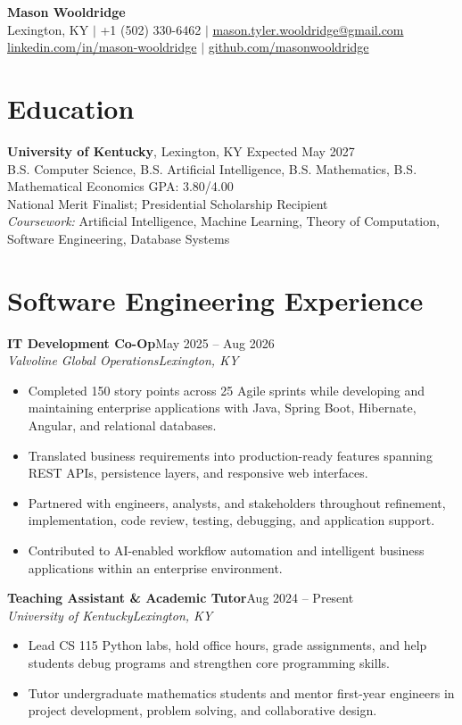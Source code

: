 \documentclass[10pt,letterpaper]{article}
\newcommand{\entry}[4]{%
  \textbf{#1}\hfill #2\\
  \textit{#3}\hfill \textit{#4}\vspace{-2pt}
}
\begin{document}
\begin{center}
  {\LARGE\bfseries Mason Wooldridge}\\[-1pt]
  Lexington, KY \enspace $\vert$ \enspace +1 (502) 330-6462 \enspace $\vert$ \enspace
  \href{mailto:mason.tyler.wooldridge@gmail.com}{mason.tyler.wooldridge@gmail.com}\\[-1pt]
  \href{https://linkedin.com/in/mason-wooldridge}{linkedin.com/in/mason-wooldridge} \enspace $\vert$ \enspace
  \href{https://github.com/masonwooldridge}{github.com/masonwooldridge}
\end{center}

\section{Education}
\textbf{University of Kentucky}, Lexington, KY \hfill Expected May 2027\\
B.S. Computer Science, B.S. Artificial Intelligence, B.S. Mathematics, B.S. Mathematical Economics \hfill GPA: 3.80/4.00\\
National Merit Finalist; Presidential Scholarship Recipient\\
\textit{Coursework:} Artificial Intelligence, Machine Learning, Theory of Computation, Software Engineering, Database Systems

\section{Software Engineering Experience}
\entry{IT Development Co-Op}{May 2025 -- Aug 2026}{Valvoline Global Operations}{Lexington, KY}
\begin{itemize}
  \item Completed 150 story points across 25 Agile sprints while developing and maintaining enterprise applications with Java, Spring Boot, Hibernate, Angular, and relational databases.
  \item Translated business requirements into production-ready features spanning REST APIs, persistence layers, and responsive web interfaces.
  \item Partnered with engineers, analysts, and stakeholders throughout refinement, implementation, code review, testing, debugging, and application support.
  \item Contributed to AI-enabled workflow automation and intelligent business applications within an enterprise environment.
\end{itemize}

\entry{Teaching Assistant \& Academic Tutor}{Aug 2024 -- Present}{University of Kentucky}{Lexington, KY}
\begin{itemize}
  \item Lead CS 115 Python labs, hold office hours, grade assignments, and help students debug programs and strengthen core programming skills.
  \item Tutor undergraduate mathematics students and mentor first-year engineers in project development, problem solving, and collaborative design.
\end{itemize}
\end{document}
